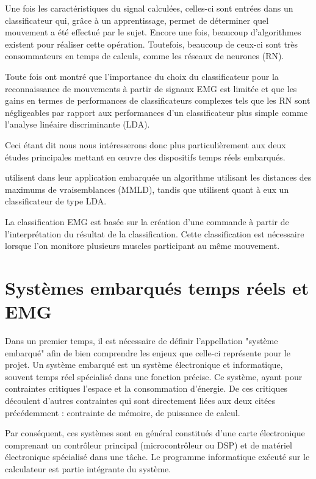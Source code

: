 \documentclass[letterpaper, twoside, 12pt, memoire, creativecommons, hyperref]{thETS}
\begin{document}
Une fois les caractéristiques du signal calculées,  celles-ci sont entrées dans un classificateur qui, grâce à un apprentissage, permet de déterminer quel mouvement a été effectué par le sujet. Encore une fois, beaucoup d’algorithmes existent pour réaliser cette opération. Toutefois, beaucoup de ceux-ci sont très consommateurs en temps de calculs, comme les réseaux de neurones (RN).

Toute fois \cite{englehart1999} ont montré que l'importance du choix du classificateur pour la reconnaissance de mouvements à partir de signaux EMG est limitée et que les gains en termes de performances de classificateurs complexes tels que les RN sont négligeables par rapport aux performances d'un classificateur plus simple comme l'analyse linéaire discriminante (LDA).

Ceci étant dit nous nous intéresserons donc plus particulièrement aux deux études principales mettant en œuvre des dispositifs temps réels embarqués.

\cite{Chang1996} utilisent dans leur application embarquée un algorithme utilisant les distances des maximums de vraisemblances (MMLD), tandis que \cite{Tenore2007} utilisent quant à eux un classificateur de type LDA.

La classification EMG est basée sur la création d'une commande à partir de l'interprétation du résultat de la classification. Cette classification est nécessaire lorsque l'on monitore plusieurs muscles participant au même mouvement. 


\section{Systèmes embarqués temps réels et EMG}

Dans un premier temps, il est nécessaire de définir l'appellation "système embarqué" afin de bien comprendre les enjeux que celle-ci représente pour le projet. Un système embarqué est un système électronique et informatique, souvent temps réel spécialisé dans une fonction précise. Ce système, ayant pour contraintes critiques l'espace et la consommation d'énergie. De ces critiques découlent d'autres contraintes qui sont directement liées aux deux citées précédemment : contrainte de mémoire, de puissance de calcul.

Par conséquent, ces systèmes sont en général constitués d'une carte électronique comprenant un contrôleur principal (microcontrôleur ou DSP) et de matériel électronique spécialisé dans une tâche. Le programme informatique exécuté sur le calculateur est partie intégrante du système.
\end{document}
